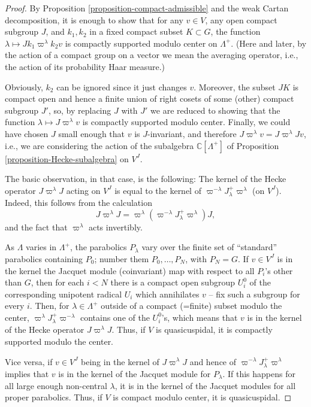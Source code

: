 \begin{proof}
By Proposition \ref{proposition-compact-admissible} and the weak Cartan decomposition, it is enough to show that for any $v\in V$, any open compact subgroup $J$, and $k_1,k_2$ in a fixed compact subset $K\subset G$, the function $\lambda\mapsto J k_1 \varpi^\lambda k_2 v$ is compactly supported modulo center on $\Lambda^+$. (Here and later, by the action of a compact group on a vector we mean the averaging operator, i.e., the action of its probability Haar measure.)


Obviously, $k_2$ can be ignored since it just changes $v$. Moreover, the subset $JK$ is compact open and hence a finite union of right cosets of some (other) compact subgroup $J'$, so, by replacing $J$ with $J'$ we are reduced to showing that the function $\lambda\mapsto J\varpi^\lambda v$ is compactly supported modulo center. Finally, we could have chosen $J$ small enough that $v$ is $J$-invariant, and therefore $J\varpi^\lambda  v = J\varpi^\lambda J v$, i.e., we are considering the action of the subalgebra $\mathbb C[\Lambda^+]$ of Proposition \ref{proposition-Hecke-subalgebra} on $V^J$.

The basic observation, in that case, is the following: The kernel of the Hecke operator $J\varpi^\lambda J$ acting on $V^J$ is equal to the kernel of $\varpi^{-\lambda} J_\lambda^+ \varpi^\lambda$ (on $V^J$). Indeed, this follows from the calculation 
$$J\varpi^\lambda J = \varpi^\lambda \left(\varpi^{-\lambda} J_\lambda^+ \varpi^\lambda\right) J,$$ 
and the fact that $\varpi^\lambda$ acts invertibly. 

As $\Lambda$ varies in $\Lambda^+$, the parabolics $P_\lambda$ vary over the finite set of ``standard'' parabolics containing $P_0$; number them $P_0, \dots, P_N$, with $P_N=G$. If $v\in V^J$ is in the kernel the Jacquet module (coinvariant) map with respect to all $P_i$'s other than $G$, then for each $i<N$ there is a compact open subgroup $U_i^0$ of the corresponding unipotent radical $U_i$ which annihilates $v$ -- fix such a subgroup for every $i$. Then, for $\lambda\in \Lambda^+$ outside of a compact (=finite) subset modulo  the center, $\varpi^\lambda J_\lambda^+ \varpi^{-\lambda}$ contains one of the $U_i^0$'s, which means that $v$ is in the kernel of the Hecke operator $J \varpi^\lambda J$. Thus, if $V$ is quasicuspidal, it is compactly supported modulo the center.

Vice versa, if $v \in V^J$ being in the kernel of $J \varpi^\lambda J$ and hence of $\varpi^{-\lambda} J_\lambda^+ \varpi^\lambda$ implies that $v$ is in the kernel of the Jacquet module for $P_\lambda$. If this happens for all large enough non-central $\lambda$, it is in the kernel of the Jacquet modules for all proper parabolics. Thus, if $V$ is compact modulo center, it is quasicuspidal.
\end{proof}


